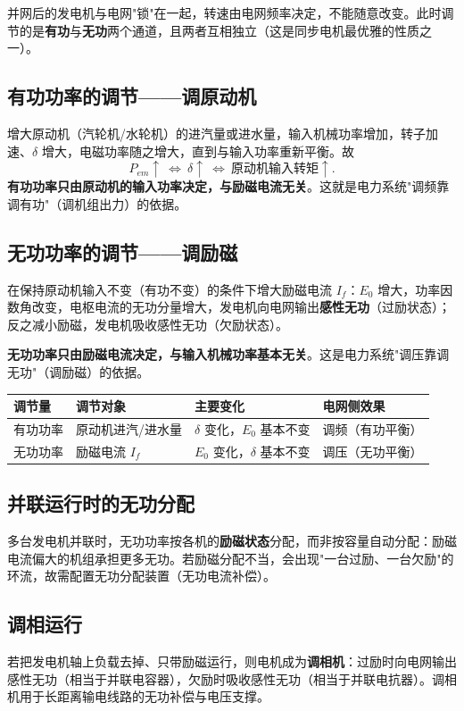 并网后的发电机与电网"锁"在一起，转速由电网频率决定，不能随意改变。此时调节的是\textbf{有功}与\textbf{无功}两个通道，且两者互相独立（这是同步电机最优雅的性质之一）。

\subsection{有功功率的调节——调原动机}
增大原动机（汽轮机/水轮机）的进汽量或进水量，输入机械功率增加，转子加速、$\delta$ 增大，电磁功率随之增大，直到与输入功率重新平衡。故
\begin{equation}
P_{em}\uparrow\ \Longleftrightarrow\ \delta\uparrow\ \Longleftrightarrow\ \text{原动机输入转矩}\uparrow .
\end{equation}
\textbf{有功功率只由原动机的输入功率决定，与励磁电流无关}。这就是电力系统"调频靠调有功"（调机组出力）的依据。

\subsection{无功功率的调节——调励磁}
在保持原动机输入不变（有功不变）的条件下增大励磁电流 $I_f$：$E_0$ 增大，功率因数角改变，电枢电流的无功分量增大，发电机向电网输出\textbf{感性无功}（过励状态）；反之减小励磁，发电机吸收感性无功（欠励状态）。

\textbf{无功功率只由励磁电流决定，与输入机械功率基本无关}。这是电力系统"调压靠调无功"（调励磁）的依据。

\begin{center}
\begin{tabular}{@{}p{2.4cm}p{3.4cm}p{3.8cm}p{3.2cm}@{}}
\toprule
调节量 & 调节对象 & 主要变化 & 电网侧效果 \\
\midrule
有功功率 & 原动机进汽/进水量 & $\delta$ 变化，$E_0$ 基本不变 & 调频（有功平衡） \\
无功功率 & 励磁电流 $I_f$ & $E_0$ 变化，$\delta$ 基本不变 & 调压（无功平衡） \\
\bottomrule
\end{tabular}
\end{center}

\subsection{并联运行时的无功分配}
多台发电机并联时，无功功率按各机的\textbf{励磁状态}分配，而非按容量自动分配：励磁电流偏大的机组承担更多无功。若励磁分配不当，会出现"一台过励、一台欠励"的环流，故需配置无功分配装置（无功电流补偿）。

\subsection{调相运行}
若把发电机轴上负载去掉、只带励磁运行，则电机成为\textbf{调相机}：过励时向电网输出感性无功（相当于并联电容器），欠励时吸收感性无功（相当于并联电抗器）。调相机用于长距离输电线路的无功补偿与电压支撑。

